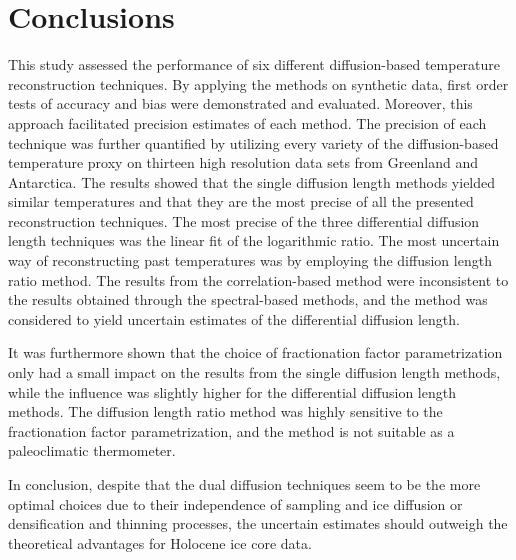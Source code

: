 \documentclass[11pt, draftcls, onecolumn]{IEEEtran} %
\numberwithin{equation}{section}
\numberwithin{table}{section}
\numberwithin{figure}{section}
\begin{document}
\section{Conclusions}  %
This study assessed the performance of six different diffusion-based temperature reconstruction
techniques.
By applying the methods on synthetic data, first order tests of accuracy and bias were demonstrated and evaluated.
Moreover, this approach facilitated precision estimates of each method.
The precision of each technique was further quantified by
utilizing every variety of the diffusion-based temperature proxy on thirteen high resolution 
data sets from Greenland and Antarctica.
The results showed that the single diffusion length methods yielded similar temperatures
and that they are the most precise of all the presented reconstruction techniques.
The most precise of the three differential diffusion length techniques was the linear fit of
the logarithmic ratio.
The most uncertain way of reconstructing past temperatures was by employing the diffusion length ratio method.
The results from the correlation-based method were inconsistent to the results obtained through the spectral-based methods,
and the method was considered to yield uncertain estimates of the differential diffusion length.

It was furthermore shown that the choice of fractionation factor parametrization 
only had a small impact on the results from the single diffusion length methods, 
while the influence was slightly higher for the differential diffusion length methods.
The diffusion length ratio method was highly sensitive to the fractionation factor parametrization,
and the method is not suitable as a paleoclimatic thermometer. 

In conclusion, despite that the dual diffusion techniques seem to be the more optimal choices 
due to their independence of sampling and ice diffusion or densification and thinning processes,
the uncertain estimates should outweigh the theoretical advantages for Holocene ice core data.

\end{document}
